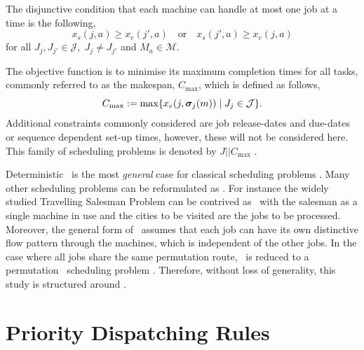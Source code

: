 \documentclass[smallextended]{svjour3}
\begin{document}
The disjunctive condition that each machine can handle at most one job at a 
time is the following,
\begin{equation}\label{eq:oneJobPerMac}
x_s(j,a) \geq x_e(j',a) \quad\textrm{or}\quad x_s(j',a) \geq x_e(j,a)  
\end{equation}
for all $J_j,J_{j'}\in\mathcal{J},\; J_j\neq J_{j'}$ and $M_a\in\mathcal{M}$. 

The objective function is to minimise its maximum completion times for all 
tasks, commonly referred to as the makespan, $C_{\max}$, which is defined as 
follows,
\begin{equation}
C_{\max} := 
\max\{x_e(j,\bm \sigma_j(m))\;|\;J_j\in\mathcal{J}\}.\label{eq:makespan}
\end{equation} 
Additional constraints commonly considered are job release-dates and due-dates 
or sequence dependent set-up times, however, these will not be considered here. 
This family of scheduling problems is denoted by $J||C_{\max}$ 
\cite{Pinedo08}.  


Deterministic \JSP\ is the most \emph{general} case for classical scheduling 
problems \cite{Jain99}. 
Many other scheduling problems can be reformulated as \JSP. 
For instance the widely studied Travelling Salesman Problem can be 
contrived as \jsp\ with the salesman as a single machine in use and the cities 
to be visited are the jobs to be processed.
Moreover, the general form of \JSP\ assumes that each job can have its own 
distinctive flow pattern through the machines, which is independent of the 
other jobs. 
In the case where all jobs share the same permutation route, \jsp\ is reduced 
to a permutation \fsp\ scheduling problem \cite{Guinet1998,Tay08}. 
Therefore, without loss of generality, this study is structured around 
\JSP. 



\section{Priority Dispatching Rules} \label{sec:constructionjssp}
\end{document}
